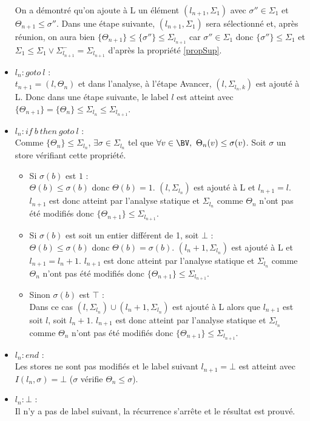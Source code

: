 \begin{itemize}
\begin{itemize}
 \end{itemize}
 On a démontré qu'on ajoute à L un élément $(l_{n+1}, \Sigma_1)$ avec $\sigma''\in\Sigma_1$ et $\Theta_{n+1}\leq\sigma''$. Dans une étape suivante, $(l_{n+1}, \Sigma_1)$ sera sélectionné et, après réunion, on aura bien $\{\Theta_{n+1}\}\leq\{\sigma''\}\leq\Sigma_{l_{n+1}}$ car $\sigma''\in\Sigma_1$ donc $\{\sigma''\}\leq\Sigma_1$ et $\Sigma_1\leq\Sigma_1\vee\Sigma^-_{l_{n+1}}=\Sigma_{l_{n+1}}$ d'après la propriété \ref{propSup}.
 \item $l_n : goto\ l$ :\\
  $t_{n+1}=(l, \Theta_n)$ et dans l'analyse, à l'étape Avancer, $(l, \Sigma_{{l_n},k})$ est ajouté à L. Donc dans une étape suivante, le label $l$ est atteint avec $\{\Theta_{n+1}\}=\{\Theta_n\}\leq\Sigma_{l_n}\leq\Sigma_{l_{n+1}}$.
 \item $l_n : if\ b\ then\ goto\ l$ :\\
  Comme $\{\Theta_n\}\leq\Sigma_{l_n}$, $\exists\sigma\in\Sigma_{l_n}$ tel que $\forall v\in\BV,\ \Theta_n(v)\leq\sigma(v)$. Soit $\sigma$ un store vérifiant cette propriété.
  \begin{itemize}
   \item Si $\sigma(b)$ est $1$ :\\
   $\Theta(b)\leq\sigma(b)$ donc $\Theta(b)=1$. $(l, \Sigma_{l_n})$ est ajouté à L et $l_{n+1}=l$. $l_{n+1}$ est donc atteint par l'analyse statique et $\Sigma_{l_n}$ comme $\Theta_n$ n'ont pas été modifiés donc $\{\Theta_{n+1}\}\leq\Sigma_{l_{n+1}}$.
  
   \item Si $\sigma(b)$ est soit un entier différent de 1, soit $\bot$ :\\
   $\Theta(b)\leq\sigma(b)$ donc $\Theta(b)=\sigma(b)$. $(l_n+1, \Sigma_{l_n})$ est ajouté à L et $l_{n+1}=l_n+1$. $l_{n+1}$ est donc atteint par l'analyse statique et $\Sigma_{l_n}$ comme $\Theta_n$ n'ont pas été modifiés donc $\{\Theta_{n+1}\}\leq\Sigma_{l_{n+1}}$.
  
   \item Sinon $\sigma(b)$ est $\top$ :\\
   Dans ce cas $(l, \Sigma_{l_n})\cup(l_n+1, \Sigma_{l_n})$ est ajouté à L alors que $l_{n+1}$ est soit $l$, soit $l_n+1$. $l_{n+1}$ est donc atteint par l'analyse statique et $\Sigma_{l_n}$ comme $\Theta_n$ n'ont pas été modifiés donc $\{\Theta_{n+1}\}\leq\Sigma_{l_{n+1}}$.
  \end{itemize}
 \item $l_n : end$ :\\
   Les stores ne sont pas modifiés et le label suivant $l_{n+1}=\bot$ est atteint avec $I(l_n,\sigma)=\bot$ ($\sigma$ vérifie $\Theta_n\leq\sigma$).
 \item $l_n : \bot$ :\\
   Il n'y a pas de label suivant, la récurrence s'arrête et le résultat est prouvé.
\end{itemize}

